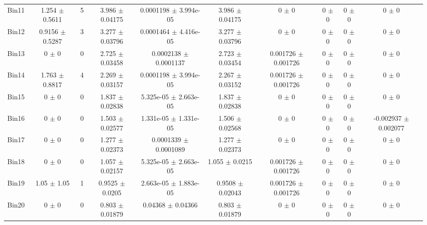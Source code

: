 \begin{tabular}{@{\extracolsep{4pt}}lccccccccc@{}}
     Bin11 & 1.254 $\pm$ 0.5611 & 5 & 3.986 $\pm$ 0.04175 & 0.0001198 $\pm$ 3.994e-05 & 3.986 $\pm$ 0.04175 & 0 $\pm$ 0 & 0 $\pm$ 0 & 0 $\pm$ 0 & 0 $\pm$ 0 \\ 
     Bin12 & 0.9156 $\pm$ 0.5287 & 3 & 3.277 $\pm$ 0.03796 & 0.0001464 $\pm$ 4.416e-05 & 3.277 $\pm$ 0.03796 & 0 $\pm$ 0 & 0 $\pm$ 0 & 0 $\pm$ 0 & 0 $\pm$ 0 \\ 
     Bin13 & 0 $\pm$ 0 & 0 & 2.725 $\pm$ 0.03458 & 0.0002138 $\pm$ 0.0001137 & 2.723 $\pm$ 0.03454 & 0.001726 $\pm$ 0.001726 & 0 $\pm$ 0 & 0 $\pm$ 0 & 0 $\pm$ 0 \\ 
     Bin14 & 1.763 $\pm$ 0.8817 & 4 & 2.269 $\pm$ 0.03157 & 0.0001198 $\pm$ 3.994e-05 & 2.267 $\pm$ 0.03152 & 0.001726 $\pm$ 0.001726 & 0 $\pm$ 0 & 0 $\pm$ 0 & 0 $\pm$ 0 \\ 
     Bin15 & 0 $\pm$ 0 & 0 & 1.837 $\pm$ 0.02838 & 5.325e-05 $\pm$ 2.663e-05 & 1.837 $\pm$ 0.02838 & 0 $\pm$ 0 & 0 $\pm$ 0 & 0 $\pm$ 0 & 0 $\pm$ 0 \\ 
     Bin16 & 0 $\pm$ 0 & 0 & 1.503 $\pm$ 0.02577 & 1.331e-05 $\pm$ 1.331e-05 & 1.506 $\pm$ 0.02568 & 0 $\pm$ 0 & 0 $\pm$ 0 & 0 $\pm$ 0 & -0.002937 $\pm$ 0.002077 \\ 
     Bin17 & 0 $\pm$ 0 & 0 & 1.277 $\pm$ 0.02373 & 0.0001339 $\pm$ 0.0001089 & 1.277 $\pm$ 0.02373 & 0 $\pm$ 0 & 0 $\pm$ 0 & 0 $\pm$ 0 & 0 $\pm$ 0 \\ 
     Bin18 & 0 $\pm$ 0 & 0 & 1.057 $\pm$ 0.02157 & 5.325e-05 $\pm$ 2.663e-05 & 1.055 $\pm$ 0.0215 & 0.001726 $\pm$ 0.001726 & 0 $\pm$ 0 & 0 $\pm$ 0 & 0 $\pm$ 0 \\ 
     Bin19 & 1.05 $\pm$ 1.05 & 1 & 0.9525 $\pm$ 0.0205 & 2.663e-05 $\pm$ 1.883e-05 & 0.9508 $\pm$ 0.02043 & 0.001726 $\pm$ 0.001726 & 0 $\pm$ 0 & 0 $\pm$ 0 & 0 $\pm$ 0 \\ 
     Bin20 & 0 $\pm$ 0 & 0 & 0.803 $\pm$ 0.01879 & 0.04368 $\pm$ 0.04366 & 0.803 $\pm$ 0.01879 & 0 $\pm$ 0 & 0 $\pm$ 0 & 0 $\pm$ 0 & 0 $\pm$ 0 \\ 
\hline\hline
  \end{tabular}
